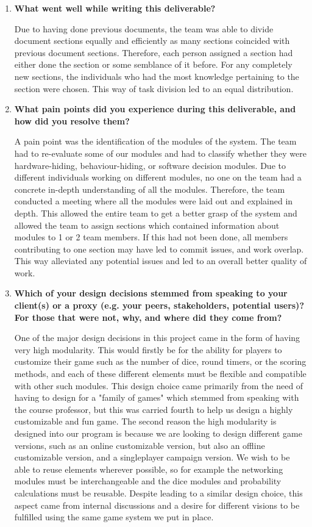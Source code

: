 \documentclass[12pt, titlepage]{article}
\begin{document}
\begin{enumerate}
  \item \textbf{What went well while writing this deliverable?} 
  
  Due to having done previous documents, the team was able to divide document sections equally and efficiently as many sections coincided with previous document sections. Therefore, each person assigned a section had either done the section or some semblance of it before. For any completely new sections, the individuals who had the most knowledge pertaining to the section were chosen. This way of task division led to an equal distribution.

  \item \textbf{What pain points did you experience during this deliverable, and how did you resolve them?}

  A pain point was the identification of the modules of the system. The team had to re-evaluate some of our modules and had to classify whether they were hardware-hiding, behaviour-hiding, or software decision modules.  Due to different individuals working on different modules, no one on the team had a concrete in-depth understanding of all the modules. Therefore, the team conducted a meeting where all the modules were laid out and explained in depth. This allowed the entire team to get a better grasp of the system and allowed the team to assign sections which contained information about modules to 1 or 2 team members. If this had not been done, all members contributing to one section may have led to commit issues, and work overlap.  This way alleviated any potential issues and led to an overall better quality of work.

  \item \textbf{Which of your design decisions stemmed from speaking to your client(s)
  or a proxy (e.g. your peers, stakeholders, potential users)? For those that
  were not, why, and where did they come from?}
  
  One of the major design decisions in this project came in the form of having very high modularity. This would firstly be for the ability for players to customize their game such as the number of dice, round timers, or the scoring methods, and each of these different elements must be flexible and compatible with other such modules. This design choice came primarily from the need of having to design for a "family of games" which stemmed from speaking with the course professor, but this was carried fourth to help us design a highly customizable and fun game. The second reason the high modularity is designed into our program is because we are looking to design different game versions, such as an online customizable version, but also an offline customizable version, and a singleplayer campaign version. We wish to be able to reuse elements wherever possible, so for example the networking modules must be interchangeable and the dice modules and probability calculations must be reusable. Despite leading to a similar design choice, this aspect came from internal discussions and a desire for different visions to be fulfilled using the same game system we put in place.
  

\end{enumerate}
\end{document}
